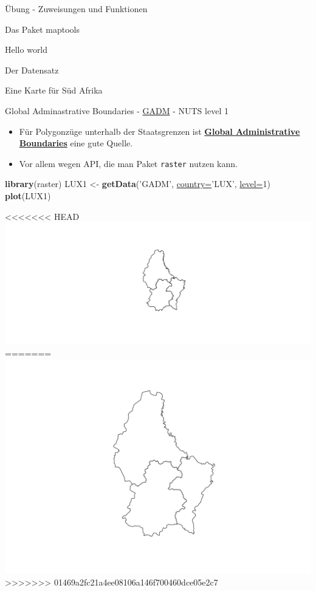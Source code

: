 \documentclass[ignorenonframetext,]{beamer}
\newenvironment{Shaded}{\begin{snugshade}}{\end{snugshade}}
\newcommand{\DataTypeTok}[1]{\textcolor[rgb]{0.74,0.68,0.62}{\underline{#1}}}
\newcommand{\DecValTok}[1]{\textcolor[rgb]{0.27,0.67,0.26}{#1}}
\newcommand{\KeywordTok}[1]{\textcolor[rgb]{0.26,0.66,0.93}{\textbf{#1}}}
\newcommand{\NormalTok}[1]{\textcolor[rgb]{0.74,0.68,0.62}{#1}}
\newcommand{\StringTok}[1]{\textcolor[rgb]{0.02,0.61,0.04}{#1}}
\providecommand{\tightlist}{%
  \setlength{\itemsep}{0pt}\setlength{\parskip}{0pt}}
\begin{document}
\begin{frame}[fragile]{Übung - Zuweisungen und Funktionen}
\begin{frame}[fragile]{Das Paket maptools}
\begin{frame}[fragile]{Hello world}
\begin{frame}[fragile]{Der Datensatz}
\begin{frame}[fragile]{Eine Karte für Süd Afrika}
\begin{frame}[fragile]{Global Adminastrative Boundaries -
\href{http://www.gadm.org/}{GADM} - NUTS level 1}
\begin{itemize}
\tightlist
\item
  Für Polygonzüge unterhalb der Staatsgrenzen ist
  \href{http://www.gadm.org/}{\textbf{Global Administrative Boundaries}}
  eine gute Quelle.
\item
  Vor allem wegen API, die man Paket \texttt{raster} nutzen kann.
\end{itemize}

\begin{Shaded}
\begin{Highlighting}[]
\KeywordTok{library}\NormalTok{(raster)}
\NormalTok{LUX1 <-}\StringTok{ }\KeywordTok{getData}\NormalTok{(}\StringTok{'GADM'}\NormalTok{, }\DataTypeTok{country=}\StringTok{'LUX'}\NormalTok{, }\DataTypeTok{level=}\DecValTok{1}\NormalTok{)}
\KeywordTok{plot}\NormalTok{(LUX1)}
\end{Highlighting}
\end{Shaded}

<<<<<<< HEAD
\includegraphics{Geomedizin_files/figure-beamer/unnamed-chunk-126-1.pdf}
=======
\includegraphics{Geomedizin_files/figure-beamer/unnamed-chunk-147-1.pdf}
>>>>>>> 01469a2fc21a4ee08106a146f700460dce05e2c7


\end{frame}
\end{frame}
\end{frame}
\end{frame}
\end{frame}
\end{frame}
\end{document}
